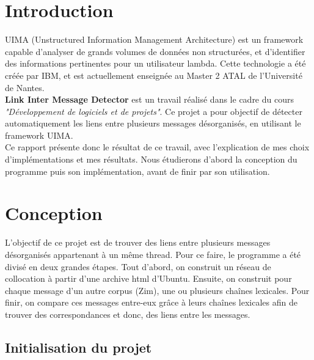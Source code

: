\documentclass[a4paper]{article}
\begin{document}
	



	\tableofcontents
	\newpage

	\section*{Introduction}
	
	UIMA (Unstructured Information Management Architecture) est un framework  capable d'analyser de grands volumes de données non structurées, et d'identifier des informations pertinentes pour un utilisateur lambda. Cette technologie a été créée par IBM, et est actuellement enseignée au Master 2 ATAL de l'Université de Nantes.\\

	\textbf{Link Inter Message Detector} est un travail réalisé dans le cadre du cours \textit{"Développement de logiciels et de projets"}. Ce projet a pour objectif de détecter automatiquement les liens entre plusieurs messages désorganisés, en utilisant le framework UIMA.\\

	Ce rapport présente donc le résultat de ce travail, avec l'explication de mes choix d'implémentations et mes résultats. Nous étudierons d'abord la conception du programme puis son implémentation, avant de finir par son utilisation.


	
	\section{Conception}
	
	L'objectif de ce projet est de trouver des liens entre plusieurs messages désorganisés appartenant à un même thread. Pour ce faire, le programme a été divisé en deux grandes étapes. Tout d'abord, on construit un réseau de collocation à partir d'une archive html d'Ubuntu. Ensuite, on construit pour chaque message d'un autre corpus (Zim), une ou plusieurs chaînes lexicales. Pour finir, on compare ces messages entre-eux grâce à leurs chaînes lexicales afin de trouver des correspondances et donc, des liens entre les messages.

	\subsection{Initialisation du projet}
	
\end{document}
